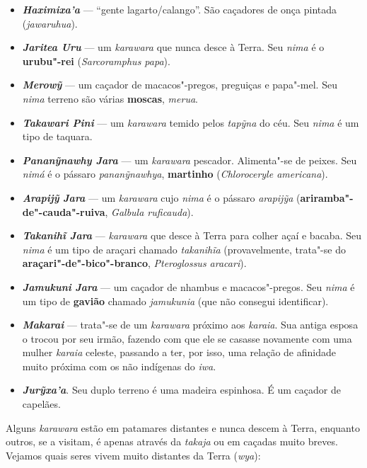 \begin{itemize}
  \emph{\textbf{Hakawỹ Jara}} --- um \emph{karawara} que caça cobras para
  se alimentar. Seu \emph{nima} na Terra é o pássaro \emph{hakawỹa},
  \textbf{acauã} (\emph{Herpetotheres cachinnans}).
\item
  \emph{\textbf{Haximixa'a}} --- ``gente lagarto/calango''. São caçadores
  de onça pintada (\emph{jawaruhua}).
\item
  \emph{\textbf{Jaritea Uru}} --- um \emph{karawara} que nunca desce à
  Terra. Seu \emph{nima} é o \textbf{urubu"-rei} (\emph{Sarcoramphus
  papa}).
\item
  \emph{\textbf{Merowỹ}} --- um caçador de macacos"-pregos, preguiças e
  papa"-mel. Seu \emph{nima} terreno são várias \textbf{moscas},
  \emph{merua}.
\item
  \emph{\textbf{Takawari Pini}} --- um \emph{karawara} temido pelos
  \emph{tapỹna} do céu. Seu \emph{nima} é um tipo de taquara.
\item
  \emph{\textbf{Pananỹnawhy Jara}} --- um \emph{karawara} pescador.
  Alimenta"-se de peixes. Seu \emph{nimá} é o pássaro
  \emph{pananỹnawhya}, \textbf{martinho} (\emph{Chloroceryle
  americana}).
\item
  \textbf{\emph{Arapijỹ} \emph{Jara}} --- um \emph{karawara} cujo
  \emph{nima} é o pássaro \emph{arapijỹa}
  (\textbf{ariramba"-de"-cauda"-ruiva}, \emph{Galbula ruficauda}).
\item
  \textbf{\emph{Takanihĩ Jara}} --- \emph{karawara} que desce à Terra para
  colher açaí e bacaba. Seu \emph{nima} é um tipo de araçari chamado
  \emph{takanihĩa} (provavelmente, trata"-se do
  \textbf{araçari"-de"-bico"-branco}, \emph{Pteroglossus aracari}).
\item
  \textbf{\emph{Jamukuni} \emph{Jara}} --- um caçador de nhambus e
  macacos"-pregos. Seu \emph{nima} é um tipo de \textbf{gavião} chamado
  \emph{jamukunia} (que não consegui identificar).
\item
  \emph{\textbf{Makarai}} --- trata"-se de um \emph{karawara} próximo aos
  \emph{karaia}. Sua antiga esposa o trocou por seu irmão, fazendo com
  que ele se casasse novamente com uma mulher \emph{karaia} celeste,
  passando a ter, por isso, uma relação de afinidade muito próxima com
  os não indígenas do \emph{iwa}.
\item
  \emph{\textbf{Jurỹxa'a}}. Seu duplo terreno é uma madeira espinhosa. É
  um caçador de capelães.
\end{itemize}

Alguns \emph{karawara} estão em patamares distantes e nunca descem à
Terra, enquanto outros, se a visitam, é apenas através da \emph{takaja}
ou em caçadas muito breves. Vejamos quais seres vivem muito distantes da
Terra (\emph{wya}):


